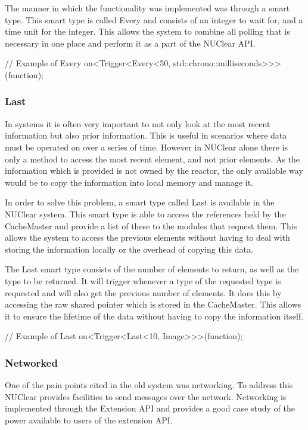 \documentclass[english,12pt]{scrartcl}
\begin{document}
				The manner in which the functionality was implemented was through a smart type.
				This smart type is called Every and consists of an integer to wait for, and a time unit for the integer.
				This allows the system to combine all polling that is necessary in one place and perform it as a part of the NUClear API.
				
				\begin{cppcode}
				// Example of Every
				on<Trigger<Every<50, std::chrono::milliseconds>>>(function);
				\end{cppcode}	
				
			\subsubsection{Last}
				In systems it is often very important to not only look at the most recent information but also prior information.
				This is useful in scenarios where data must be operated on over a series of time.
				However in NUClear alone there is only a method to access the most recent element, and not prior elements.
				As the information which is provided is not owned by the reactor, the only available way would be to copy the information into local memory and manage it.
				
				In order to solve this problem, a smart type called Last is available in the NUClear system.
				This smart type is able to access the references held by the CacheMaster and provide a list of these to the modules that request them.
				This allows the system to access the previous elements without having to deal with storing the information locally or the overhead of copying this data.
				
				The Last smart type consists of the number of elements to return, as well as the type to be returned.
				It will trigger whenever a type of the requested type is requested and will also get the previous number of elements.
				It does this by accessing the raw shared pointer which is stored in the CacheMaster.
				This allows it to ensure the lifetime of the data without having to copy the information itself.
				
				\begin{cppcode}
				// Example of Last
				on<Trigger<Last<10, Image>>>(function);
				\end{cppcode}
	
			\subsubsection{Networked}
				One of the pain points cited in the old system was networking. 
				To address this NUClear provides facilities to send messages over the network.
				Networking is implemented through the Extension API and provides a good case study of the power available to users of the extension API.
				
\end{document}
